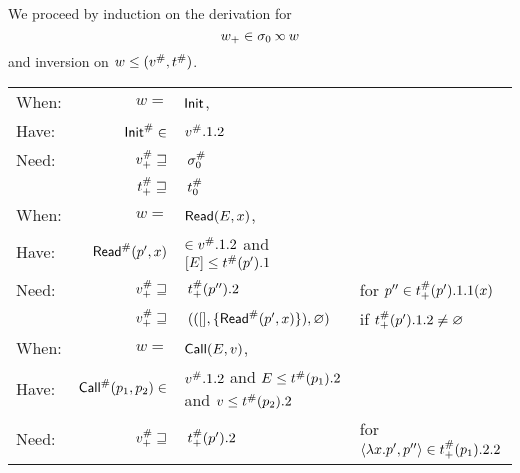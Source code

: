 \documentclass{article}
\begin{document}
We proceed by induction on the derivation for
\[w_+\in\ctx_0\semlink w\]
and inversion on $w\le({v}^{\#},{t}^{\#})$.
\begin{center}
	\begin{tabular}{|l@{\hskip2pt}r@{\hskip2pt}l@{\hskip2pt}l|}
		\hline
		When: & $w=$                                & $\textsf{Init}$,                                                                  &                                                              \\
		Have: & ${\textsf{Init}}^{\#}\in$                     & ${v}^{\#}.1.2$                                                              &                                                              \\
		Need: & ${v}^{\#}_+\sqsupseteq$              & $\:{\sigma}^{\#}_0$                                                             &                                                              \\
		      & ${t}^{\#}_+\sqsupseteq$           & $\:{t}^{\#}_0$                                                           &                                                              \\
		\hline
		When: & $w=$                                & $\textsf{Read}(E,x)$,                                                        &                                                              \\
		Have: & ${\textsf{Read}}^{\#}(p',x)$                  & $\in{v}^{\#}.1.2$ and $[E]\le{t}^{\#}(p').1$                         &                                                              \\
		Need: & ${v}^{\#}_+\sqsupseteq$              & $\:{t}^{\#}_+(p'').2$                                                    & for $p''\in{t}^{\#}_+(p').1.1(x)$                          \\
		      & ${v}^{\#}_+\sqsupseteq$              & $\:(([],\{{\textsf{Read}}^{\#}(p',x)\}),\varnothing)$                                & if ${t}^{\#}_+(p').1.2\neq\varnothing$                     \\
		\hline
		When: & $w=$                                & $\textsf{Call}(E,v)$,                                                        &                                                              \\
		Have: & ${\textsf{Call}}^{\#}(p_1,p_2)\in$            & ${v}^{\#}.1.2$ and $E\le{t}^{\#}(p_1).2$ and $v\le{t}^{\#}(p_2).2$ &                                                              \\
		Need: & ${v}^{\#}_+\sqsupseteq$              & $\:{t}^{\#}_+(p').2$                                                     & for $\langle\lambda x.p',p''\rangle\in{t}^{\#}_+(p_1).2.2$ \\

\end{tabular}
\end{center}
\end{document}
